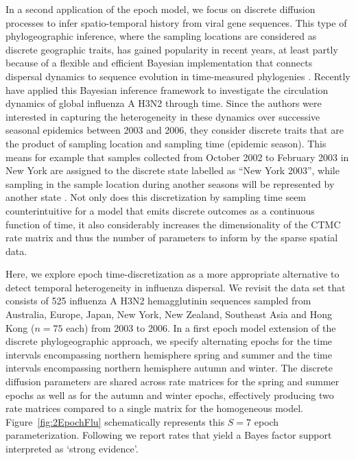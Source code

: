 In a second application of the epoch model, we focus on discrete diffusion processes to infer spatio-temporal history from viral gene sequences.
This type of phylogeographic inference, where the sampling locations are considered as discrete geographic traits, has gained popularity in recent years, at least partly because of a flexible and efficient Bayesian implementation that connects dispersal dynamics to sequence evolution in time-measured phylogenies \citep{Lemey2009}.
Recently \citet{Bahl2011} have applied this Bayesian inference framework to investigate the circulation dynamics of global influenza A H3N2 through time.
Since the authors were interested in capturing the heterogeneity in these dynamics over successive seasonal epidemics between 2003 and 2006, they consider discrete traits that are the product of sampling location and sampling time (epidemic season).
This means for example that samples collected from October 2002 to February 2003 in New York are assigned to the discrete state labelled as ``New York 2003'', while sampling in the sample location during another seasons will be represented by another state \citep{Bahl2011}.
Not only does this discretization by sampling time seem counterintuitive for a model that emits discrete outcomes as a continuous function of time, it also considerably increases the dimensionality of the CTMC rate matrix and thus the number of parameters to inform by the sparse spatial data.

Here, we explore epoch time-discretization as a more appropriate alternative to detect temporal heterogeneity in influenza dispersal.
We revisit the \citet{Bahl2011} data set that consists of 525 influenza A H3N2 hemagglutinin sequences sampled from  Australia, Europe, Japan, New York, New Zealand, Southeast Asia and Hong Kong ($n=75$ each) from 2003 to 2006.
In a first epoch model extension of the discrete phylogeographic approach, we specify alternating epochs for the time intervals encompassing northern hemisphere spring and summer and the time intervals encompassing northern hemisphere autumn and winter.
The discrete diffusion parameters are shared across rate matrices for the spring and summer epochs as well as for the autumn and winter epochs, effectively producing two rate matrices compared to a single matrix for the homogeneous model. Figure~\ref{fig:2EpochFlu} schematically represents this $S=7$ epoch parameterization. 
Following \cite{KassRaftery95} we report rates that yield a Bayes factor support interpreted as `strong evidence'.

